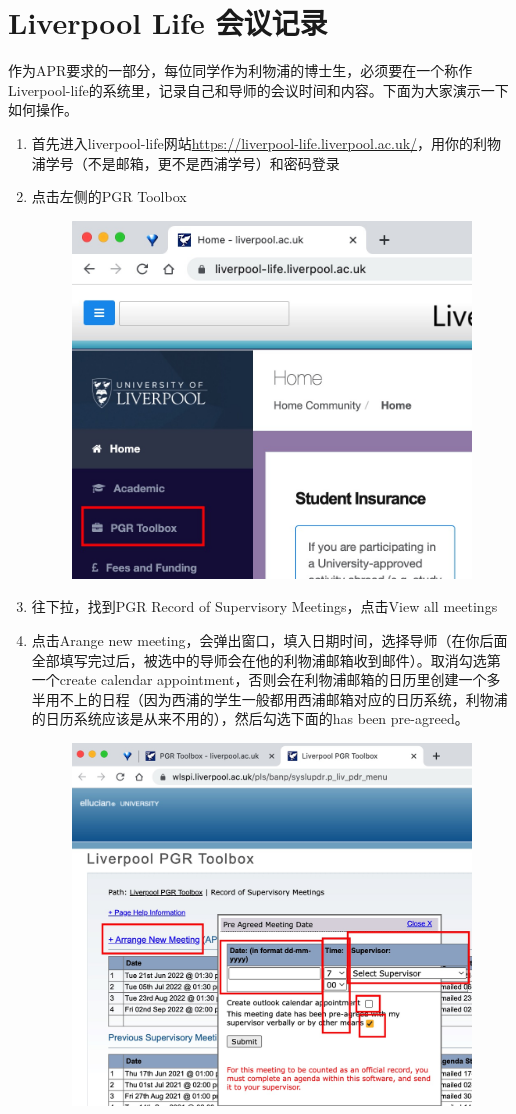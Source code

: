 \section{Liverpool Life 会议记录}
\label{sec.meeting_record}
作为APR要求的一部分，每位同学作为利物浦的博士生，必须要在一个称作Liverpool-life的系统里，记录自己和导师的会议时间和内容。下面为大家演示一下如何操作。

\begin{enumerate}
    \item 首先进入liverpool-life网站\url{https://liverpool-life.liverpool.ac.uk/}，用你的利物浦学号（不是邮箱，更不是西浦学号）和密码登录
    \item 点击左侧的PGR Toolbox
    \begin{figure}[H]
        \centering
        \includegraphics[width=0.5\columnwidth]{author-folder/Kai.Wu/meeting_record_figures/toolbox.jpg}
    \end{figure}
    \item 往下拉，找到PGR Record of Supervisory Meetings，点击View all meetings
    \item 点击Arange new meeting，会弹出窗口，填入日期时间，选择导师（在你后面全部填写完过后，被选中的导师会在他的利物浦邮箱收到邮件）。取消勾选第一个create calendar appointment，否则会在利物浦邮箱的日历里创建一个多半用不上的日程（因为西浦的学生一般都用西浦邮箱对应的日历系统，利物浦的日历系统应该是从来不用的），然后勾选下面的has been pre-agreed。
    \begin{figure}[H]
        \centering
        \includegraphics[width=0.5\columnwidth]{author-folder/Kai.Wu/meeting_record_figures/arange_new_meeting.jpg}

\end{figure}
\end{enumerate}
